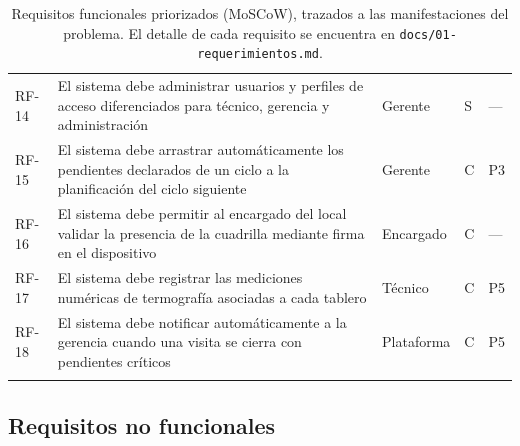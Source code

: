 \documentclass[10pt,letterpaper]{article}
\begin{document}
\begin{longtable}{@{}p{1.4cm}p{8.4cm}p{1.8cm}p{1.6cm}p{1.4cm}@{}}
RF-14 & El sistema debe administrar usuarios y perfiles de acceso diferenciados para técnico, gerencia y administración & Gerente & S & --- \\
RF-15 & El sistema debe arrastrar automáticamente los pendientes declarados de un ciclo a la planificación del ciclo siguiente & Gerente & C & P3 \\
RF-16 & El sistema debe permitir al encargado del local validar la presencia de la cuadrilla mediante firma en el dispositivo & Encargado & C & --- \\
RF-17 & El sistema debe registrar las mediciones numéricas de termografía asociadas a cada tablero & Técnico & C & P5 \\
RF-18 & El sistema debe notificar automáticamente a la gerencia cuando una visita se cierra con pendientes críticos & Plataforma & C & P5 \\
\bottomrule
\caption{Requisitos funcionales priorizados (MoSCoW), trazados a las manifestaciones
del problema. El detalle de cada requisito se encuentra en
\texttt{docs/01-requerimientos.md}.}
\end{longtable}

\subsection{Requisitos no funcionales}
\end{document}
